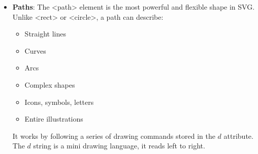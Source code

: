 \documentclass{report}
\begin{document}
\begin{itemize}
\begin{itemize}
                \item text-anchor
                \item dominant-baseline
                \item alignment-baseline
                \item direction
                \item writing-mode
                \item display
                \item visibility
                \item overflow
                \item clip-path
                \item mask
                \item filter
                \item cursor
                \item pointer-events
                \item animation
                \item animation-name
                \item animation-duration
                \item animation-delay
                \item animation-iteration-count
                \item animation-timing-function
                \item transition
                \item transition-property
                \item transition-duration
            \end{itemize}
        \item \textbf{Paths}: The <path> element is the most powerful and flexible shape in SVG. Unlike <rect> or <circle>, a path can describe:
            \begin{itemize}
                \item Straight lines
                \item Curves
                \item Arcs
                \item Complex shapes
                \item Icons, symbols, letters
                \item Entire illustrations
            \end{itemize}
            It works by following a series of drawing commands stored in the $d$ attribute. The $d$ string is a mini drawing language, it reads left to right.

\end{itemize}
\end{document}

